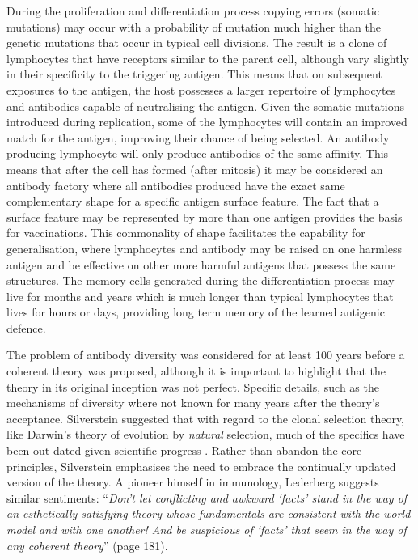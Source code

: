 During the proliferation and differentiation process copying errors (somatic mutations) may occur with a probability of mutation much higher than the genetic mutations that occur in typical cell divisions. The result is a clone of lymphocytes that have receptors similar to the parent cell, although vary slightly in their specificity to the triggering antigen. This means that on subsequent exposures to the antigen, the host possesses a larger repertoire of lymphocytes and antibodies capable of neutralising the antigen. Given the somatic mutations introduced during replication, some of the lymphocytes will contain an improved match for the antigen, improving their chance of being selected. An antibody producing lymphocyte will only produce antibodies of the same affinity. This means that after the cell has formed (after mitosis) it may be considered an antibody factory where all antibodies produced have the exact same complementary shape for a specific antigen surface feature. The fact that a surface feature may be represented by more than one antigen provides the basis for vaccinations. This commonality of shape facilitates the capability for generalisation, where lymphocytes and antibody may be raised on one harmless antigen and be effective on other more harmful antigens that possess the same structures. The memory cells generated during the differentiation process may live for months and years which is much longer than typical lymphocytes that lives for hours or days, providing long term memory of the learned antigenic defence.

The problem of antibody diversity was considered for at least 100 years before a coherent theory was proposed, although it is important to highlight that the theory in its original inception was not perfect. Specific details, such as the mechanisms of diversity where not known for many years after the theory's acceptance. Silverstein suggested that with regard to the clonal selection theory, like Darwin's theory of evolution by \emph{natural} selection, much of the specifics have been out-dated given scientific progress \cite{Silverstein2002}. Rather than abandon the core principles, Silverstein emphasises the need to embrace the continually updated version of the theory. A pioneer himself in immunology, Lederberg suggests similar sentiments: ``\emph{Don't let conflicting and awkward `facts' stand in the way of an esthetically satisfying theory whose fundamentals are consistent with the world model and with one another! And be suspicious of `facts' that seem in the way of any coherent theory}'' \cite{Lederberg1988} (page 181).

